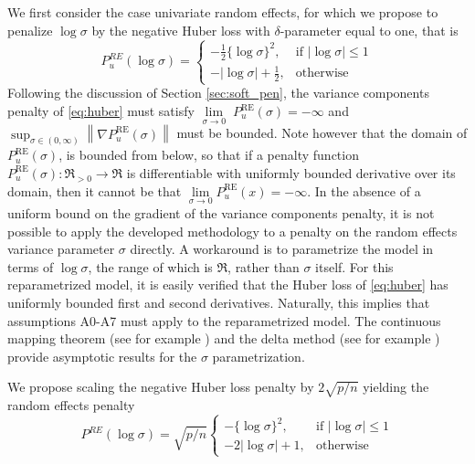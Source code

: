 \documentclass[11pt, a4paper]{article}
\newcommand{\vnorm}[1]{\ensuremath{{\left\| #1 \right\|}}}
\theoremstyle{example} \newtheorem{example}{Example}[section]
\theoremstyle{theorem} \newtheorem{theorem}{Theorem}[section]
\begin{document}
We first consider the case univariate random effects, for which we propose to penalize $\log\sigma$ by the negative Huber loss with $\delta$-parameter equal to one, that is 
\begin{equation} \label{eq:huber}
P_u^{\textit{RE}}(\log\sigma) = \begin{cases}
-\frac{1}{2} \{\log \sigma\}^2, & \text{if } |\log \sigma|\leq 1 \\ 
- |\log \sigma| + \frac{1}{2}, & \text{otherwise}
\end{cases}
\end{equation}
Following the discussion of Section \ref{sec:soft_pen}, the variance components penalty of \eqref{eq:huber} must satisfy $\lim\limits_{\sigma \to 0} \; P_u^{\text{RE}}(\sigma) = -\infty$ and $\sup_{\sigma \in (0,\infty) } \vnorm{\nabla P_u^{\text{RE}}(\sigma)}$ must be bounded. Note however that the domain of $P^{\text{RE}}_u(\sigma)$, is bounded from below, so that if a penalty function $P^{\text{RE}}_u(\sigma):\Re_{>0} \to \Re$ is differentiable with uniformly bounded derivative over its domain, then it cannot be that $\lim\limits_{\sigma \to 0}P^{\text{RE}}_u(x) = -\infty$. In the absence of a uniform bound on the gradient of the variance components penalty, it is not possible to apply the developed methodology to a penalty on the random effects variance parameter $\sigma$ directly. A workaround is to parametrize the model in terms of $\log\sigma$, the range of which is $\Re$, rather than $\sigma$ itself. For this reparametrized model, it is easily verified that the Huber loss of \eqref{eq:huber} has uniformly bounded first and second derivatives. Naturally, this implies that assumptions A0-A7 must apply to the reparametrized model. The continuous mapping theorem (see for example  \citet[Theorem. 2.3]{vaart:1998}) and the delta method (see for example \citet[Chapter 3]{vaart:1998}) provide asymptotic results for the $\sigma$ parametrization. 

We propose scaling the negative Huber loss penalty by $2\sqrt{p/n}$ yielding the random effects penalty 
\begin{equation} \label{eq:scaled_huber}
P^{\textit{RE}}(\log\sigma) = \sqrt{p/n}\begin{cases}
- \{\log \sigma\}^2, & \text{if } |\log \sigma|\leq 1 \\ 
- 2|\log \sigma| + 1, & \text{otherwise}
\end{cases}
\end{equation}
\end{document}
